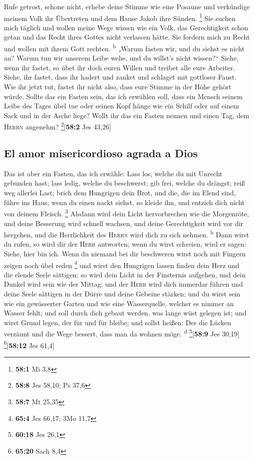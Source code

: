  Rufe getrost, schone nicht, erhebe deine Stimme wie eine
Posaune und verkündige meinem Volk ihr Übertreten und dem Hause Jakob
ihre Sünden. \footnote{\textbf{58:1} Mi 3,8}  Sie suchen
mich täglich und wollen meine Wege wissen wie ein Volk, das
Gerechtigkeit schon getan und das Recht ihres Gottes nicht verlassen
hätte. Sie fordern mich zu Recht und wollen mit ihrem Gott rechten.
\textsuperscript{b}  „Warum fasten wir, und du siehst es
nicht an? Warum tun wir unserem Leibe wehe, und du willst's nicht
wissen?{}`` Siehe, wenn ihr fastet, so übet ihr doch euren Willen und
treibet alle eure Arbeiter.  Siehe, ihr fastet, dass ihr
hadert und zanket und schlaget mit gottloser Faust. Wie ihr jetzt tut,
fastet ihr nicht also, dass eure Stimme in der Höhe gehört würde.
 Sollte das ein Fasten sein, das ich erwählen soll, dass
ein Mensch seinem Leibe des Tages übel tue oder seinen Kopf hänge wie
ein Schilf oder auf einem Sack und in der Asche liege? Wollt ihr das ein
Fasten nennen und einen Tag, dem \textsc{Herrn} angenehm?
\footnote{\textbf{58:8} Jes 58,10; Ps 37,6}{[}\textbf{58:2} Jes 43,26{]}

\hypertarget{el-amor-misericordioso-agrada-a-dios}{%
\subsection{El amor misericordioso agrada a
Dios}\label{el-amor-misericordioso-agrada-a-dios}}

 Das ist aber ein Fasten, das ich erwähle: Lass los,
welche du mit Unrecht gebunden hast; lass ledig, welche du beschwerst;
gib frei, welche du drängst; reiß weg allerlei Last; 
brich dem Hungrigen dein Brot, und die, die im Elend sind, führe ins
Haus; wenn du einen nackt siehst, so kleide ihn, und entzieh dich nicht
von deinem Fleisch. \footnote{\textbf{58:7} Mt 25,35} 
Alsdann wird dein Licht hervorbrechen wie die Morgenröte, und deine
Besserung wird schnell wachsen, und deine Gerechtigkeit wird vor dir
hergehen, und die Herrlichkeit des \textsc{Herrn} wird dich zu sich
nehmen. \textsuperscript{b}  Dann wirst du rufen, so wird
dir der \textsc{Herr} antworten; wenn du wirst schreien, wird er sagen:
Siehe, hier bin ich. Wenn du niemand bei dir beschweren wirst noch mit
Fingern zeigen noch übel reden \footnote{\textbf{65:4} Jes 66,17; 3Mo
  11,7}  und wirst den Hungrigen lassen finden dein Herz
und die elende Seele sättigen: so wird dein Licht in der Finsternis
aufgehen, und dein Dunkel wird sein wie der Mittag;  und
der \textsc{Herr} wird dich immerdar führen und deine Seele sättigen in
der Dürre und deine Gebeine stärken; und du wirst sein wie ein
gewässerter Garten und wie eine Wasserquelle, welcher es nimmer an
Wasser fehlt;  und soll durch dich gebaut werden, was
lange wüst gelegen ist; und wirst Grund legen, der für und für bleibe;
und sollst heißen: Der die Lücken verzäunt und die Wege bessert, dass
man da wohnen möge. \textsuperscript{d} \footnote{\textbf{60:18} Jes
  26,1}{[}\textbf{58:9} Jes 30,19{]} \footnote{\textbf{65:20} Sach 8,4}{[}\textbf{58:12}
Jes 61,4{]}

